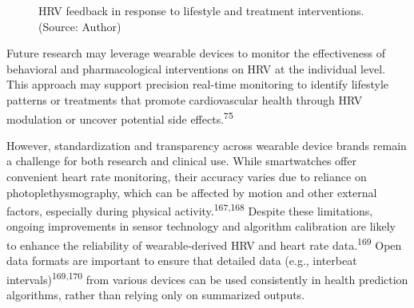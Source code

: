 \documentclass[
  letterpaper,
  headsepline=true,
  open=any]{scrbook}
\begin{document}
\begin{figure}

\begin{minipage}[t]{\linewidth}

{\centering 


\caption{HRV feedback in response to lifestyle and treatment
interventions. (Source: Author)}

}

\end{minipage}%

\end{figure}

Future research may leverage wearable devices to monitor the
effectiveness of behavioral and pharmacological interventions on HRV at
the individual level. This approach may support precision real-time
monitoring to identify lifestyle patterns or treatments that promote
cardiovascular health through HRV modulation or uncover potential side
effects.\textsuperscript{75}

However, standardization and transparency across wearable device brands
remain a challenge for both research and clinical use. While
smartwatches offer convenient heart rate monitoring, their accuracy
varies due to reliance on photoplethysmography, which can be affected by
motion and other external factors, especially during physical
activity.\textsuperscript{167,168} Despite these limitations, ongoing
improvements in sensor technology and algorithm calibration are likely
to enhance the reliability of wearable-derived HRV and heart rate
data.\textsuperscript{169} Open data formats are important to ensure
that detailed data (e.g., interbeat intervals)\textsuperscript{169,170}
from various devices can be used consistently in health prediction
algorithms, rather than relying only on summarized outputs.
\end{document}
